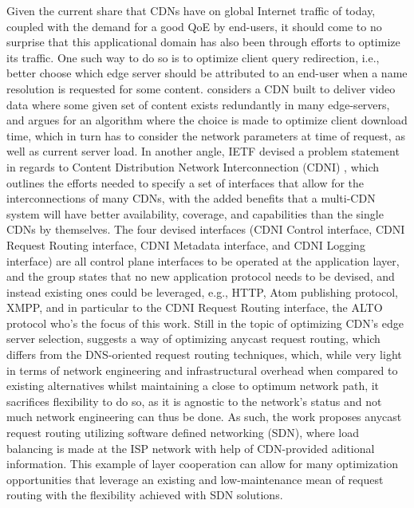 \documentclass[
  oneside,
  11pt, a4paper,
  footinclude=true,
  headinclude=true,
  cleardoublepage=empty
]{scrbook}
\begin{document}
	Given the current share that CDNs have on global Internet traffic of today, coupled with the demand for a good QoE by end-users, it should come to no surprise that this applicational domain has also been through efforts to optimize its traffic. One such way to do so is to optimize client query redirection, i.e., better choose which edge server should be attributed to an end-user when a name resolution is requested for some content. \cite{gromov2014} considers a CDN built to deliver video data where some given set of content exists redundantly in many edge-servers, and argues for an algorithm where the choice is made to optimize client download time, which in turn has to consider the network parameters at time of request, as well as current server load. In another angle, IETF devised a problem statement in regards to Content Distribution Network Interconnection (CDNI) \cite{cdni-problem-statement}, which outlines the efforts needed to specify a set of interfaces that allow for the interconnections of many CDNs, with the added benefits that a multi-CDN system will have better availability, coverage, and capabilities than the single CDNs by themselves. The four devised interfaces (CDNI Control interface, CDNI Request
    Routing interface, CDNI Metadata interface, and CDNI Logging
    interface) are all control plane interfaces to be operated at the application layer, and the group states that no new application protocol needs to be devised, and instead existing ones could be leveraged, e.g., HTTP, Atom publishing protocol, XMPP, and in particular to the CDNI Request Routing interface, the ALTO protocol who's the focus of this work. Still in the topic of optimizing CDN's edge server selection, \cite{wichtlhuber2017} suggests a way of optimizing anycast request routing, which differs from the DNS-oriented request routing techniques, which, while very light in terms of network engineering and infrastructural overhead when compared to existing alternatives whilst maintaining a close to optimum network path, it sacrifices flexibility to do so, as it is agnostic to the network's status and not much network engineering can thus be done. As such, the work proposes anycast request routing utilizing software defined networking (SDN), where load balancing is made at the ISP network with help of CDN-provided aditional information. This example of layer cooperation can allow for many optimization opportunities that leverage an existing and low-maintenance mean of request routing with the flexibility achieved with SDN solutions.
	
\end{document}
